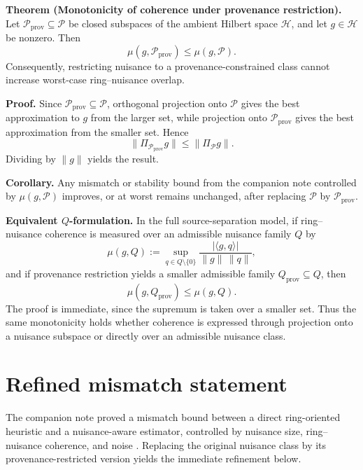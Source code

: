 \documentclass[10pt,letterpaper,twocolumn]{article}
\begin{document}
\par\smallskip\noindent\textbf{Theorem (Monotonicity of coherence under provenance restriction).} Let $\mathcal P_{\mathrm{prov}}\subseteq\mathcal P$ be closed subspaces of the ambient Hilbert space $\mathcal H$, and let $g\in\mathcal H$ be nonzero. Then
\[
\mu(g,\mathcal P_{\mathrm{prov}})\le \mu(g,\mathcal P).
\]
Consequently, restricting nuisance to a provenance-constrained class cannot increase worst-case ring--nuisance overlap.

\par\smallskip\noindent\textbf{Proof.} Since $\mathcal P_{\mathrm{prov}}\subseteq\mathcal P$, orthogonal projection onto $\mathcal P$ gives the best approximation to $g$ from the larger set, while projection onto $\mathcal P_{\mathrm{prov}}$ gives the best approximation from the smaller set. Hence
\[
\|\Pi_{\mathcal P_{\mathrm{prov}}}g\|\le \|\Pi_{\mathcal P}g\|.
\]
Dividing by $\|g\|$ yields the result.

\par\smallskip\noindent\textbf{Corollary.} Any mismatch or stability bound from the companion note controlled by $\mu(g,\mathcal P)$ improves, or at worst remains unchanged, after replacing $\mathcal P$ by $\mathcal P_{\mathrm{prov}}$.

\par\smallskip\noindent\textbf{Equivalent $Q$-formulation.} In the full source-separation model, if ring--nuisance coherence is measured over an admissible nuisance family $Q$ by
\[
\mu(g,Q):=\sup_{q\in Q\setminus\{0\}} \frac{|\langle g,q\rangle|}{\|g\|\,\|q\|},
\]
and if provenance restriction yields a smaller admissible family $Q_{\mathrm{prov}}\subseteq Q$, then
\[
\mu(g,Q_{\mathrm{prov}})\le \mu(g,Q).
\]
The proof is immediate, since the supremum is taken over a smaller set. Thus the same monotonicity holds whether coherence is expressed through projection onto a nuisance subspace or directly over an admissible nuisance class.

\section{Refined mismatch statement}

The companion note proved a mismatch bound between a direct ring-oriented heuristic and a nuisance-aware estimator, controlled by nuisance size, ring--nuisance coherence, and noise \cite{LandersFourierBHEX}. Replacing the original nuisance class by its provenance-restricted version yields the immediate refinement below.
\end{document}
